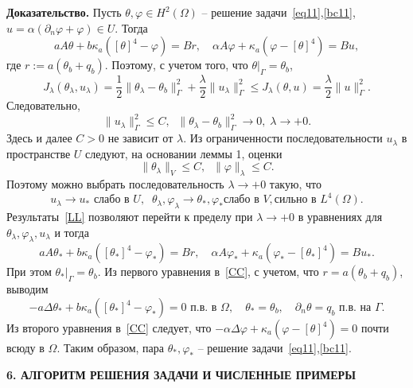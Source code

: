\documentclass[12pt]{article}
\begin{document}
    {\bf Доказательство.}
    Пусть $\theta,\varphi\in H^2(\Omega)$ -- решение задачи~\eqref{eq11},\eqref{bc11},
    $u=\alpha(\partial_n\varphi+\varphi)\in U.$ Тогда
    \[
        a A \theta + b \kappa_a ([\theta]^4 - \varphi ) = Br,\quad
        \alpha A \varphi + \kappa_a (\varphi - [\theta]^4)  = Bu,
    \]
    где $r:=a(\theta_b+q_b).$ Поэтому, с учетом того, что $\theta|_\Gamma=\theta_b$,
    \[
        J_\lambda(\theta_\lambda, u_\lambda) = \frac{1}{2}\|\theta_\lambda -\theta_b\|^2_\Gamma
        + \frac{\lambda}{2}\|u_\lambda\|^2_\Gamma\leq J_\lambda(\theta, u)=\frac{\lambda}{2}\|u\|^2_\Gamma.
    \]
    Следовательно,
    \[
        \|u_\lambda\|^2_\Gamma\leq C,\;\; \|\theta_\lambda -\theta_b\|^2_\Gamma\to 0,\; \lambda\to +0.
    \]
    Здесь и далее $C>0$ не зависит от $\lambda.$
    Из ограниченности последовательности $u_\lambda$ в пространстве $U$ следуют, на основании
    леммы 1, оценки
    \[
        \|\theta_\lambda\|_V \leq C,\;\;
        \|\varphi\|_\lambda \leq C.
    \]
    Поэтому можно выбрать последовательность $\lambda\to+0$ такую, что
    \begin{equation}
        \label{LL}
        u_\lambda \rightarrow u_* \text{  слабо в } U, \;\;
        \theta_\lambda, \varphi_\lambda \rightarrow \theta_*,\varphi_* \text{
            слабо в } V, \text{
            сильно в } L^4(\Omega).
    \end{equation}
    Результаты~\eqref{LL} позволяют перейти к пределу при $\lambda\to+0$
    в уравнениях для $\theta_\lambda,\varphi_\lambda,u_\lambda$ и тогда
    \begin{equation}
        \label{CC}
        a A \theta_* + b \kappa_a ([\theta_*]^4 - \varphi_* ) = Br,\quad
        \alpha A \varphi_* + \kappa_a (\varphi_* - [\theta_*]^4)  = Bu_*.
    \end{equation}
    При этом $\theta_*|_\Gamma=\theta_b.$
    Из первого уравнения в~\eqref{CC}, с учетом, что $r=a(\theta_b+q_b)$,
    выводим
    \[
        - a\Delta\theta_* + b\kappa_a([\theta_*]^4- \varphi_*)=0 \text{ п.в. в }\Omega,
        \quad \theta_*=\theta_b,\quad \partial_n\theta = q_b \text{ п.в. на  }\Gamma.
    \]
    Из второго уравнения в~\eqref{CC} следует, что $-\alpha \Delta \varphi +
    \kappa_a(\varphi-[\theta]^4)=0$ почти всюду в $\Omega.$ Таким образом,
    пара $\theta_*,\varphi_*$ -- решение задачи~\eqref{eq11},\eqref{bc11}.




    \begin{center}
        \textbf{6. АЛГОРИТМ РЕШЕНИЯ ЗАДАЧИ И ЧИСЛЕННЫЕ ПРИМЕРЫ}
    \end{center}
\end{document}

